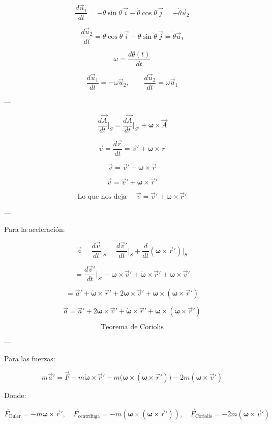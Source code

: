 \documentclass[a4paper,12pt]{article}
\begin{document}
\[
\frac{d\vec{u}_1}{dt} = -\dot{\theta}\sin\theta\,\vec{i} - \dot{\theta}\cos\theta\,\vec{j} 
= -\dot{\theta}\vec{u}_2
\]

\[
\frac{d\vec{u}_2}{dt} = \dot{\theta}\cos\theta\,\vec{i} - \dot{\theta}\sin\theta\,\vec{j} 
= \dot{\theta}\vec{u}_1
\]

\[
\omega = \frac{d\theta(t)}{dt}
\]

\[
\frac{d\vec{u}_1}{dt} = -\omega \vec{u}_2, 
\qquad 
\frac{d\vec{u}_2}{dt} = \omega \vec{u}_1
\]

---

\[
\frac{d\vec{A}}{dt}\Big|_{S} = \frac{d\vec{A}}{dt}\Big|_{S'} + \boldsymbol{\omega} \times \vec{A}
\]

\[
\vec{v} = \frac{d\vec{r}}{dt} = \vec{v}' + \boldsymbol{\omega}\times \vec{r}
\]

\[
\vec{v} = \vec{v}' + \boldsymbol{\omega}\times\vec{r}
\]

\[
\vec{v} = \vec{v}' + \boldsymbol{\omega}\times\vec{r}' 
\]

\[
\text{Lo que nos deja } \quad \vec{v} = \vec{v}' + \boldsymbol{\omega}\times \vec{r}'
\]

---

Para la aceleración:

\[
\vec{a} = \frac{d\vec{v}}{dt}\Big|_S = \frac{d\vec{v}'}{dt}\Big|_{S} + \frac{d}{dt}(\boldsymbol{\omega}\times \vec{r}')\Big|_{S}
\]

\[
= \frac{d\vec{v}'}{dt}\Big|_{S'} + \boldsymbol{\omega}\times \vec{v}' + 
\dot{\boldsymbol{\omega}}\times \vec{r}' + \boldsymbol{\omega}\times \vec{v}' 
\]

\[
= \vec{a}' + \dot{\boldsymbol{\omega}}\times \vec{r}' + 2\boldsymbol{\omega}\times \vec{v}' 
+ \boldsymbol{\omega}\times (\boldsymbol{\omega}\times \vec{r}')
\]

\[
\vec{a} = \vec{a}' + 2\boldsymbol{\omega}\times \vec{v}' + \dot{\boldsymbol{\omega}}\times \vec{r}' + \boldsymbol{\omega}\times (\boldsymbol{\omega}\times \vec{r}')
\]

\[
\text{Teorema de Coriolis}
\]

---

Para las fuerzas:

\[
m\vec{a}' = \vec{F} - m\dot{\boldsymbol{\omega}}\times \vec{r}' - m\big(\boldsymbol{\omega}\times (\boldsymbol{\omega}\times \vec{r}')\big) - 2m(\boldsymbol{\omega}\times \vec{v}')
\]

Donde:

\[
\vec{F}_{\text{Euler}} = -m\dot{\boldsymbol{\omega}}\times \vec{r}', 
\quad \vec{F}_{\text{centrífuga}} = -m(\boldsymbol{\omega}\times (\boldsymbol{\omega}\times \vec{r}')), 
\quad \vec{F}_{\text{Coriolis}} = -2m(\boldsymbol{\omega}\times \vec{v}')
\]
\end{document}

